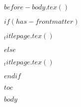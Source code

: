 \documentclass{book}
\begin{document}
$before-body.tex()$

$if(has-frontmatter)$
  \begin{frontmatter}
  \begin{titlepage}
  $_titlepage.tex()$
  
  \end{titlepage}
  \end{frontmatter}
$else$
  \begin{titlepage}
  $_titlepage.tex()$
  
  \end{titlepage}
$endif$


$toc$

$body$
\end{document}
